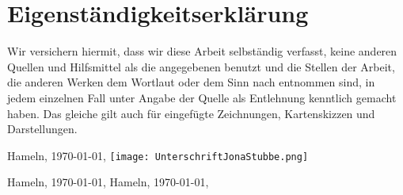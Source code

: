 \documentclass[a4paper,12pt,titlepage]{article}
\begin{document}
\part{Eigenständigkeitserklärung}
Wir versichern hiermit, dass wir diese Arbeit selbständig verfasst, keine anderen Quellen und Hilfsmittel
als die angegebenen benutzt und die Stellen der Arbeit, die anderen Werken dem Wortlaut oder dem Sinn nach entnommen sind,
in jedem einzelnen Fall unter Angabe der Quelle als Entlehnung kenntlich gemacht haben.
Das gleiche gilt auch für eingefügte Zeichnungen, Kartenskizzen und Darstellungen.

Hameln, \today, \texttt{[image: UnterschriftJonaStubbe.png]}

Hameln, \today,
Hameln, \today,
\end{document}
